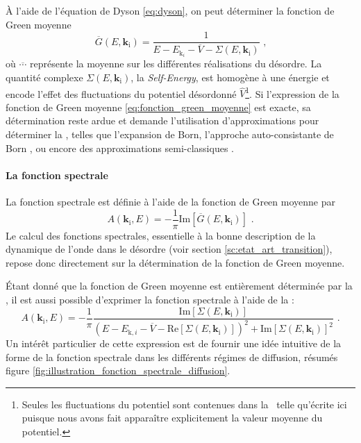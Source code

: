 À l'aide de l'équation de Dyson \ref{eq:dyson}, on peut déterminer la fonction de Green moyenne 
\begin{equation}
\overline{G}(E,\mathbf{k}_{\mathrm{i}})=\frac{1}{E-E_{\mathrm{k}_i}-\overline{V}-\Sigma(E,\mathbf{k}_{\mathrm{i}})} \text{ ,}
\label{eq:fonction_green_moyenne}
\end{equation}
où $\overline{\cdots}$ représente la moyenne sur les différentes réalisations du désordre. La quantité complexe $\Sigma(E,\mathbf{k}_{\mathrm{i}})$, la \emph{Self-Energy}, est homogène à une énergie et encode l'effet des fluctuations du potentiel désordonné $\hat{V}$\footnote{Seules les fluctuations du potentiel sont contenues dans la \selfenergy\ telle qu'écrite ici puisque nous avons fait apparaître explicitement la valeur moyenne du potentiel.}. Si l'expression de la fonction de Green moyenne \ref{eq:fonction_green_moyenne} est exacte, sa détermination reste ardue et demande l'utilisation d'approximations pour déterminer la \selfenergy , telles que l'expansion de Born\citep{kuhn2007coherent}\citep{lugan2009one}, l'approche auto-consistante de Born \citep{skipetrov2008anderson}\citep{yedjour2010diffusion}, ou encore des approximations semi-classiques \citep{trappe2015semiclassical}\citep{prat2016semiclassical}. 


\paragraph*{La fonction spectrale}
La fonction spectrale est définie à l'aide de la fonction de Green moyenne par
\begin{equation}
A(\mathbf{k}_{\mathrm{i}},E)= -\frac{1}{\pi} \mathrm{Im}[\overline{G}(E,\mathbf{k}_{\mathrm{i}})] \text{ .}
\end{equation}
Le calcul des fonctions spectrales, essentielle à la bonne description de la dynamique de l'onde dans le désordre (voir section \ref{sc:etat_art_transition}), repose donc directement sur la détermination de la fonction de Green moyenne.

Étant donné que la fonction de Green moyenne est entièrement déterminée par la \selfenergy , il est aussi possible d'exprimer la fonction spectrale à l'aide de la \selfenergy :
\begin{equation}
A(\mathbf{k}_{\mathrm{i}},E)=-\frac{1}{\pi}\frac{\mathrm{Im}[\Sigma(E,\mathbf{k}_{\mathrm{i}})]}{(E-E_{\mathrm{k},i}-\overline{V}-\mathrm{Re}[\Sigma(E,\mathbf{k}_{\mathrm{i}})])^2+\mathrm{Im}[\Sigma(E,\mathbf{k}_{\mathrm{i}})]^2} \text{ .}
\label{eq:fonction_spectrale_self_energy}
\end{equation}
Un intérêt particulier de cette expression est de fournir une idée intuitive de la forme de la fonction spectrale dans les différents régimes de diffusion, résumés figure \ref{fig:illustration_fonction_spectrale_diffusion}. 

